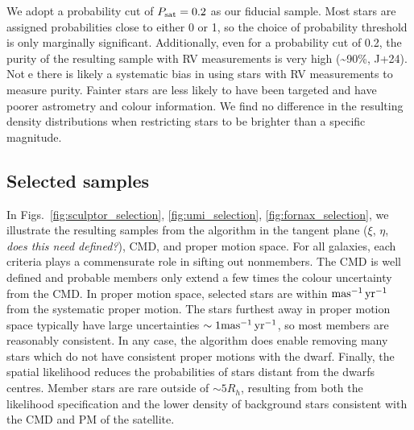 We adopt a probability cut of \(P_{\rm sat} = 0.2\) as our fiducial
sample. Most stars are assigned probabilities close to either 0 or 1, so
the choice of probability threshold is only marginally significant.
Additionally, even for a probability cut of 0.2, the purity of the
resulting sample with RV measurements is very high (\textasciitilde90\%,
J+24). Note there is likely a systematic bias in using stars with RV
measurements to measure purity. Fainter stars are less likely to have
been targeted and have poorer astrometry and colour information. We find
no difference in the resulting density distributions when restricting
stars to be brighter than a specific magnitude.

\subsection{Selected samples}\label{selected-samples}

In
Figs.~\ref{fig:sculptor_selection}, \ref{fig:umi_selection}, \ref{fig:fornax_selection},
we illustrate the resulting samples from the algorithm in the tangent
plane (\(\xi\), \(\eta\), \emph{does this need defined?}), CMD, and
proper motion space. For all galaxies, each criteria plays a
commensurate role in sifting out nonmembers. The CMD is well defined and
probable members only extend a few times the colour uncertainty from the
CMD. In proper motion space, selected stars are within \({\rm mas^{-1}\,yr^{-1}}\) from
the systematic proper motion. The stars furthest away in proper motion
space typically have large uncertainties \(\sim 1{\rm mas^{-1}\,yr^{-1}}\), so most
members are reasonably consistent. In any case, the algorithm does
enable removing many stars which do not have consistent proper motions
with the dwarf. Finally, the spatial likelihood reduces the
probabilities of stars distant from the dwarfs centres. Member stars are
rare outside of \(\sim5R_h\), resulting from both the likelihood
specification and the lower density of background stars consistent with
the CMD and PM of the satellite.

